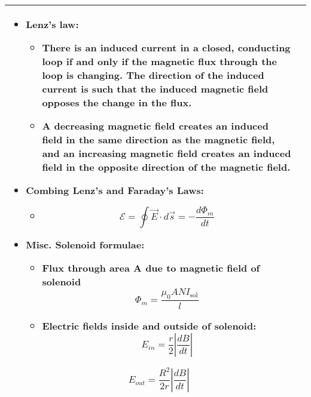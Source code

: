 \documentclass{article}
\begin{document}
\begin{center}
\begin{tabular}{|p{8cm}|p{8cm}|}
		\begin{itemize}

			\item Lenz's law:
			      \begin{itemize}
				      \item There is an induced current in a closed, conducting loop if
				            and only if the magnetic flux through the loop is changing.
				            The direction of the induced current is such that the induced
				            magnetic field opposes the change in the flux.
				      \item A decreasing magnetic field creates an induced field in the same direction as the magnetic field, and an increasing magnetic field creates an induced field in the opposite direction of the magnetic field.
			      \end{itemize}
			\item Combing Lenz's and Faraday's Laws:
			      \begin{itemize}
				      \item  \[ \mathcal{E} = \oint \vec{E} \cdot d\vec{s} = -\frac{d\Phi_m}{dt}\]
			      \end{itemize}

			\item Misc. Solenoid formulae:
				  \begin{itemize}
					  \item Flux through area A due to magnetic field of solenoid\[ \Phi_m = \frac{\mu_0 A N I_\text{sol}}{l} \]
       \item Electric fields inside and outside of solenoid:
       \[E_{in} = \frac{r}{2}\left\lvert \frac{dB}{dt} \right\rvert \]
				  \end{itemize}
		\[E_{out} = \frac{R^2}{2r}\left\lvert \frac{dB}{dt} \right\rvert \]

		\end{itemize}

		\\
		\hline
	\end{tabular}
\end{center}
\end{document}
